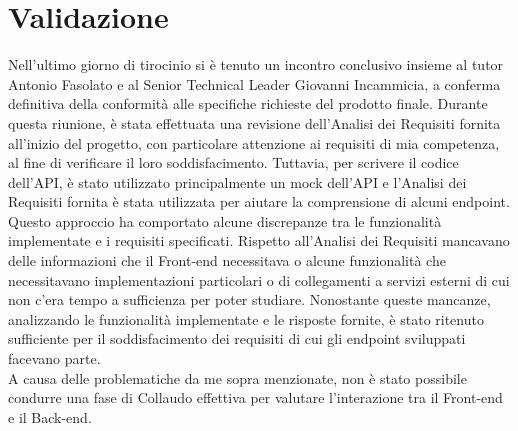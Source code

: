 \hypertarget{validation}{\section{Validazione}}
Nell’ultimo giorno di tirocinio si è tenuto un incontro conclusivo insieme al tutor Antonio Fasolato e al Senior Technical Leader Giovanni Incammicia, a conferma definitiva della conformità alle specifiche richieste del prodotto finale. Durante questa riunione, è stata effettuata una revisione dell'Analisi dei Requisiti fornita all'inizio del progetto, con particolare attenzione ai requisiti di mia competenza, al fine di verificare il loro soddisfacimento. Tuttavia, per scrivere il codice dell’API, è stato utilizzato principalmente un mock dell’API e l’Analisi dei Requisiti fornita è stata utilizzata per aiutare la comprensione di alcuni endpoint. Questo approccio ha comportato alcune discrepanze tra le funzionalità implementate e i requisiti specificati. Rispetto all’Analisi dei Requisiti mancavano delle informazioni che il Front-end necessitava o alcune funzionalità che necessitavano implementazioni particolari o di collegamenti a servizi esterni di cui non c’era tempo a sufficienza per poter studiare. Nonostante queste mancanze, analizzando le funzionalità implementate e le risposte fornite, è stato ritenuto sufficiente per il soddisfacimento dei requisiti di cui gli endpoint sviluppati facevano parte.\\
A causa delle problematiche da me sopra menzionate, non è stato possibile condurre una fase di Collaudo effettiva per valutare l'interazione tra il Front-end e il Back-end.